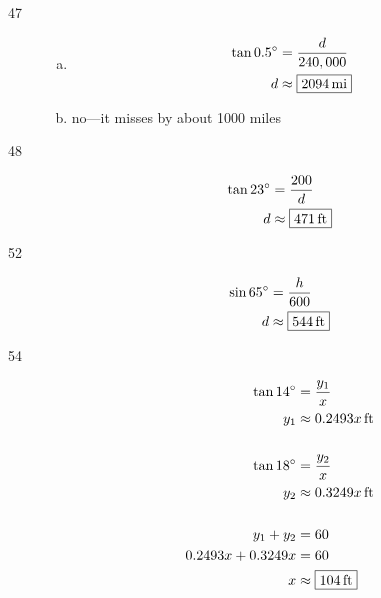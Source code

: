 \documentclass{exam}
\newcommand{\dg}{\ensuremath{^\circ}}
\begin{document}
\begin{description}
\begin{enumerate}[(a)]
        \end{enumerate}

      \pagebreak

      \item[47]
        \begin{enumerate}[(a)]
          \item 
            \begin{align*}
              \tan 0.5 \dg & = \frac{d}{240,000} \\
              d           & \approx \boxed{ \unit[2094]{mi} } \\
            \end{align*}

          \item 
            no---it misses by about 1000 miles
        \end{enumerate}

      \item[48]
        \begin{align*}
          \tan 23 \dg & = \frac{200}{d} \\
          d           & \approx \boxed{ \unit[471]{ft} } \\
        \end{align*}

      \item[52]
        \begin{align*}
          \sin 65 \dg & = \frac{h}{600} \\
          d           & \approx \boxed{ \unit[544]{ft} } \\
        \end{align*}

      \item[54]
        \begin{align*}
          \tan 14 \dg & = \frac{y_1}{x} \\
          y_1         & \approx \unit[0.2493 x]{ft} \\
          \\
          \tan 18 \dg & = \frac{y_2}{x} \\
          y_2         & \approx \unit[0.3249 x]{ft} \\
          \\
          y_1 + y_2           & = 60 \\
          0.2493 x + 0.3249 x & = 60 \\
          x                   & \approx \boxed{ \unit[104]{ft} } \\
        \end{align*}


\end{description}
\end{document}
